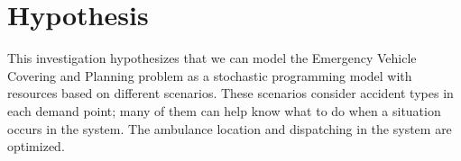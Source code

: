 



\section{Hypothesis}
This investigation hypothesizes that we can model the Emergency Vehicle Covering and Planning problem as a stochastic programming model with resources based on different scenarios. These scenarios consider accident types in each demand point; many of them can help know what to do when a situation occurs in the  system. The ambulance location and dispatching in the system are optimized.

